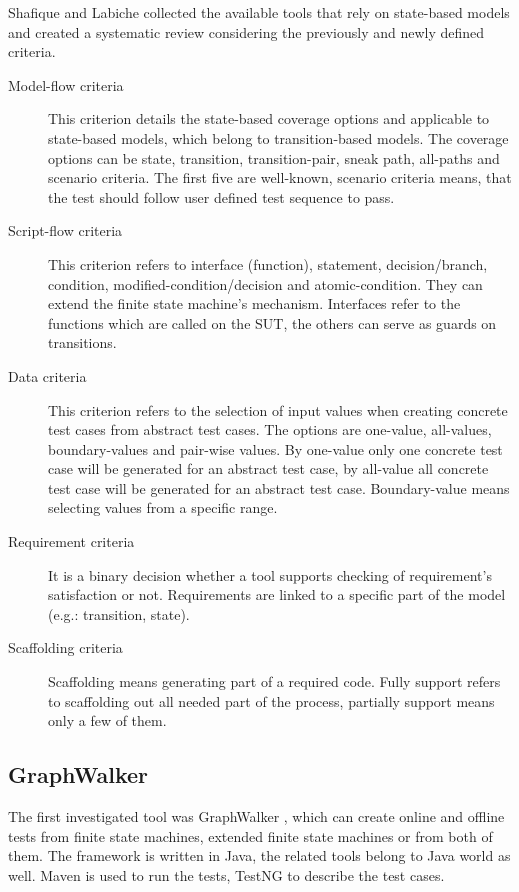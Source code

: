 \documentclass{article}
\begin{document}
Shafique and Labiche \cite{toolsreview} collected the available tools that rely on state-based models and created a systematic review considering the previously and newly defined criteria.

\begin{description}
	\item[Model-flow criteria] This criterion details the state-based coverage options and applicable to state-based models, which belong to transition-based models. The coverage options can be state, transition, transition-pair, sneak path, all-paths and scenario criteria. The first five are well-known, scenario criteria means, that the test should follow user defined test sequence to pass.
	\item[Script-flow criteria] This criterion refers to interface (function), statement, decision/branch, condition, modified-condition/decision and atomic-condition. They can extend the finite state machine's mechanism. Interfaces refer to the functions which are called on the SUT, the others can serve as guards on transitions.
	\item[Data criteria] This criterion refers to the selection of input values when creating concrete test cases from abstract test cases. The options are one-value, all-values, boundary-values and pair-wise values. By one-value only one concrete test case will be generated for an abstract test case, by all-value all concrete test case will be generated for an abstract test case. Boundary-value means selecting values from a specific range.
	\item[Requirement criteria] It is a binary decision whether a tool supports checking of requirement's satisfaction or not. Requirements are linked to a specific part of the model (e.g.: transition, state).
	\item[Scaffolding criteria] Scaffolding means generating part of a required code. Fully support refers to scaffolding out all needed part of the process, partially support means only a few of them.
\end{description}

\subsection{GraphWalker}
\label{sub:graphwalker}

The first investigated tool was GraphWalker \cite{graphwalker}, which can create online and offline tests from finite state machines, extended finite state machines or from both of them. The framework is written in Java, the related tools belong to Java world as well. Maven is used to run the tests, TestNG to describe the test cases.
\end{document}
